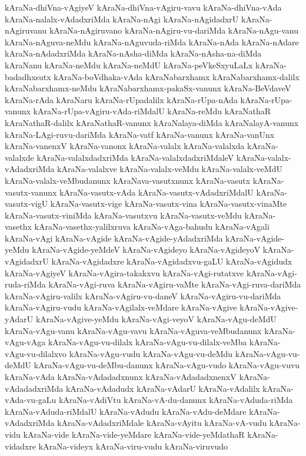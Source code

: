 {kAraNa-dhiVna-vAgiyeV
kAraNa-dhiVna-vAgiru-vavu
kAraNa-dhiVna-vAda
kAraNa-nalalx-vAdadxriMda
kAraNa-nAgi
kAraNa-nAgidadxrU
kAraNa-nAgiruvanu
kAraNa-nAgiruvano
kAraNa-nAgiru-vu-dariMda
kAraNa-nAgu-vanu
kAraNa-nAguva-neMdu
kAraNa-nAguvuda-riMda
kAraNa-nAda
kAraNa-nAdare
kAraNa-nAdadxriMda
kAraNa-nAsha-diMda
kAraNa-nAsha-na-diMda
kAraNanu
kAraNa-neMdu
kAraNa-neMdU
kAraNa-peVkeSxyuLaLx
kAraNa-badadhxsutx
kAraNa-boVdhaka-vAda
kAraNabarxhamx
kAraNabarxhamx-dalilx
kAraNabarxhamx-neMdu
kAraNabarxhamx-pakaSx-vanunx
kAraNa-BeVdaveV
kAraNa-rAda
kAraNaru
kAraNa-rUpadalilx
kAraNa-rUpa-nAda
kAraNa-rUpa-vanunx
kAraNa-rUpa-vAgiru-vAda-riMdalU
kAraNa-reMdu
kAraNathaR
kAraNathaR-dalilx
kAraNathaR-vanunx
kAraNalaya-diMda
kAraNalayA-vanunx
kAraNa-LAgi-ruvu-dariMda
kAraNa-vatf
kAraNa-vanunx
kAraNa-vanUnx
kAraNa-vanenxV
kAraNa-vanonx
kAraNa-valalx
kAraNa-valalxda
kAraNa-valalxde
kAraNa-valalxdadxriMda
kAraNa-valalxdadxriMdaleV
kAraNa-valalx-vAdadxriMda
kAraNa-valalxve
kAraNa-valalx-veMdu
kAraNa-valalx-veMdU
kAraNa-valalx-veMbudanunx
kAraNava-vasutxnunx
kAraNa-vasutx
kAraNa-vasutx-vanunx
kAraNa-vasutx-vAda
kAraNa-vasutx-vAdadxriMdalU
kAraNa-vasutx-vigU
kAraNa-vasutx-vige
kAraNa-vasutx-vina
kAraNa-vasutx-vinaMte
kAraNa-vasutx-viniMda
kAraNa-vasutxvu
kAraNa-vasutx-veMdu
kAraNa-vasethx
kAraNa-vasethx-yalilxruva
kAraNa-vAga-bahudu
kAraNa-vAgali
kAraNa-vAgi
kAraNa-vAgide
kAraNa-vAgide-yAdadxriMda
kAraNa-vAgide-yeMdu
kAraNa-vAgide-yeMdeV
kAraNa-vAgideyo
kAraNa-vAgideyoV
kAraNa-vAgidadxrU
kAraNa-vAgidadxre
kAraNa-vAgidadxvu-gaLU
kAraNa-vAgidudx
kAraNa-vAgiyeV
kAraNa-vAgira-takakxvu
kAraNa-vAgi-rutatxve
kAraNa-vAgi-ruda-riMda
kAraNa-vAgi-ruva
kAraNa-vAgiru-vaMte
kAraNa-vAgi-ruva-dariMda
kAraNa-vAgiru-valilx
kAraNa-vAgiru-vu-daneV
kAraNa-vAgiru-vu-dariMda
kAraNa-vAgiru-vudu
kAraNa-vAgilalx-veMdare
kAraNa-vAgive
kAraNa-vAgive-yAdarU
kAraNa-vAgive-yeMdu
kAraNa-vAgi-veyoV
kAraNa-vAgu-deMdU
kAraNa-vAgu-vanu
kAraNa-vAgu-vavu
kAraNa-vAguva-veMbudanunx
kAraNa-vAgu-vAga
kAraNa-vAgu-vu-dilalx
kAraNa-vAgu-vu-dilalx-veMba
kAraNa-vAgu-vu-dilalxvo
kAraNa-vAgu-vudu
kAraNa-vAgu-vu-deMdu
kAraNa-vAgu-vu-deMdU
kAraNa-vAgu-vu-deMbu-danunx
kAraNa-vAgu-vudo
kAraNa-vAgu-vuvu
kAraNa-vAda
kAraNa-vAdadadxnunx
kAraNa-vAdadadxnenxV
kAraNa-vAdadadxriMda
kAraNa-vAdadudx
kAraNa-vAdarU
kAraNa-vAdalilx
kAraNa-vAda-vu-gaLu
kAraNa-vAdiVtu
kAraNa-vA-du-danunx
kAraNa-vAduda-riMda
kAraNa-vAduda-riMdalU
kAraNa-vAdudu
kAraNa-vAdu-deMdare
kAraNa-vAdadxriMda
kAraNa-vAdadxriMdale
kAraNa-vAyitu
kAraNa-vA-vudu
kAraNa-vidu
kAraNa-vide
kAraNa-vide-yeMdare
kAraNa-vide-yeMdathaR
kAraNa-vidadxre
kAraNa-videyx
kAraNa-viru-vudu
kAraNa-viruvudo
}
